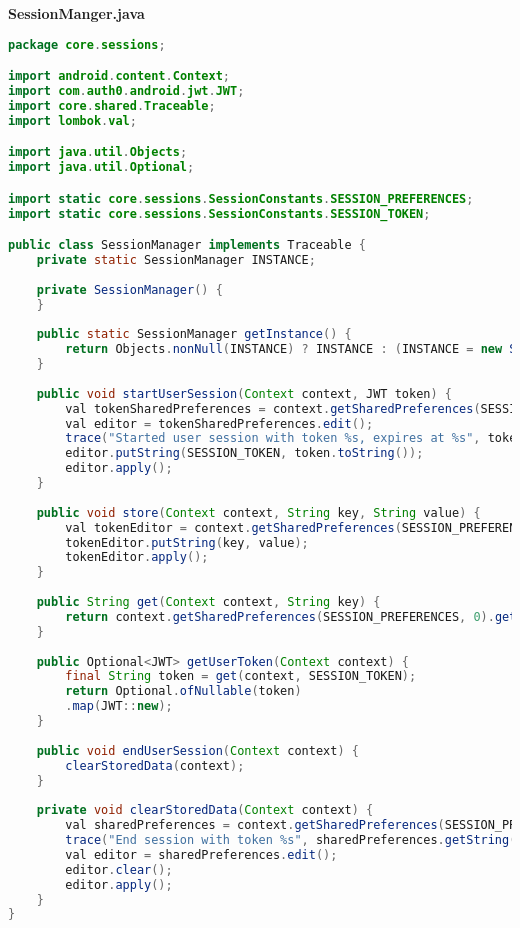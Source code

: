 \textbf{SessionManger.java}
\begin{lstlisting}[language=Java]
package core.sessions;

import android.content.Context;
import com.auth0.android.jwt.JWT;
import core.shared.Traceable;
import lombok.val;

import java.util.Objects;
import java.util.Optional;

import static core.sessions.SessionConstants.SESSION_PREFERENCES;
import static core.sessions.SessionConstants.SESSION_TOKEN;

public class SessionManager implements Traceable {
	private static SessionManager INSTANCE;
	
	private SessionManager() {
	}
	
	public static SessionManager getInstance() {
		return Objects.nonNull(INSTANCE) ? INSTANCE : (INSTANCE = new SessionManager());
	}
	
	public void startUserSession(Context context, JWT token) {
		val tokenSharedPreferences = context.getSharedPreferences(SESSION_PREFERENCES, 0);
		val editor = tokenSharedPreferences.edit();
		trace("Started user session with token %s, expires at %s", token.toString(), token.getExpiresAt());
		editor.putString(SESSION_TOKEN, token.toString());
		editor.apply();
	}
	
	public void store(Context context, String key, String value) {
		val tokenEditor = context.getSharedPreferences(SESSION_PREFERENCES, 0).edit();
		tokenEditor.putString(key, value);
		tokenEditor.apply();
	}
	
	public String get(Context context, String key) {
		return context.getSharedPreferences(SESSION_PREFERENCES, 0).getString(key, null);
	}
	
	public Optional<JWT> getUserToken(Context context) {
		final String token = get(context, SESSION_TOKEN);
		return Optional.ofNullable(token)
		.map(JWT::new);
	}
	
	public void endUserSession(Context context) {
		clearStoredData(context);
	}
	
	private void clearStoredData(Context context) {
		val sharedPreferences = context.getSharedPreferences(SESSION_PREFERENCES, 0);
		trace("End session with token %s", sharedPreferences.getString(SESSION_TOKEN, null));
		val editor = sharedPreferences.edit();
		editor.clear();
		editor.apply();
	}
}	
\end{lstlisting}

